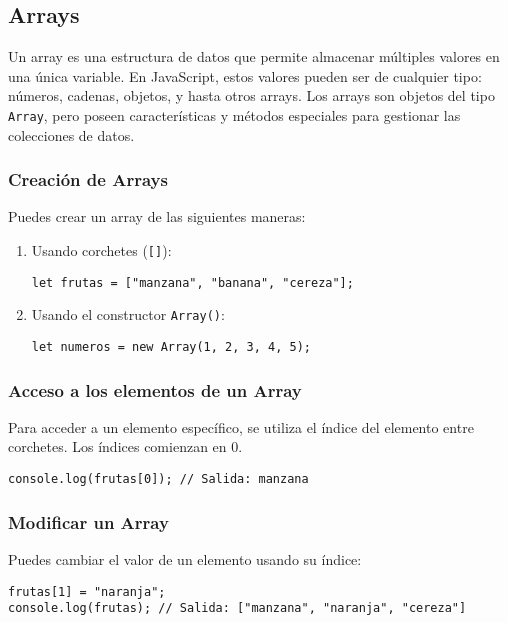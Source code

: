 \documentclass[executivepaper]{article}
\begin{document}
\subsection{Arrays}

Un array es una estructura de datos que permite almacenar múltiples valores en una única variable. En JavaScript, estos valores pueden ser de cualquier tipo: números, cadenas, objetos, y hasta otros arrays. Los arrays son objetos del tipo \texttt{Array}, pero poseen características y métodos especiales para gestionar las colecciones de datos.

\subsubsection*{Creación de Arrays}
Puedes crear un array de las siguientes maneras:

\begin{enumerate}
    \item Usando corchetes (\texttt{[]}):
\begin{lstlisting}
let frutas = ["manzana", "banana", "cereza"];
\end{lstlisting}

    \item Usando el constructor \texttt{Array()}:
\begin{lstlisting}
let numeros = new Array(1, 2, 3, 4, 5);
\end{lstlisting}
\end{enumerate}

\subsubsection*{Acceso a los elementos de un Array}
Para acceder a un elemento específico, se utiliza el índice del elemento entre corchetes. Los índices comienzan en 0.
\begin{lstlisting}
console.log(frutas[0]); // Salida: manzana
\end{lstlisting}

\subsubsection*{Modificar un Array}
Puedes cambiar el valor de un elemento usando su índice:
\begin{lstlisting}
frutas[1] = "naranja";
console.log(frutas); // Salida: ["manzana", "naranja", "cereza"]
\end{lstlisting}
\end{document}
